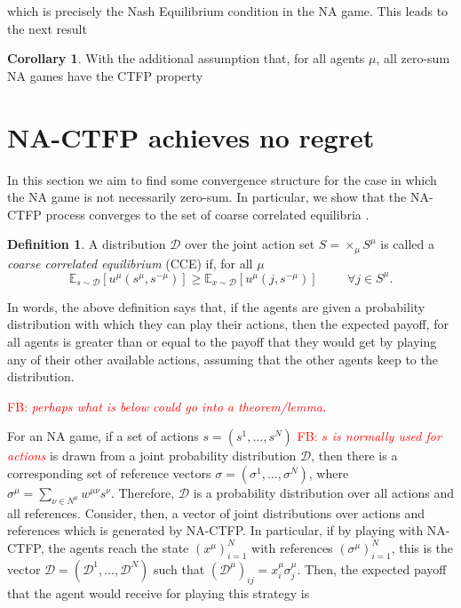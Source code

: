 \documentclass{article}
\theoremstyle{definition}
\newtheorem{definition}{Definition}
\newtheorem{corollary}{Corollary}
\newcommand{\fb}[1]{\textcolor{red}{FB: \textit{#1}}}
\newcommand{\wmunu}{w^{\mu \nu}}
\newcommand{\xmu}{x^{\mu}}
\newcommand{\refmu}{\sigma^{\mu}}
\begin{document}
  which is precisely the Nash Equilibrium condition in the NA game. This leads to the next result

  \begin{corollary}
    With the additional assumption that, for all agents $\mu$, all zero-sum NA games have the CTFP property
  \end{corollary}

\section{NA-CTFP achieves no regret}
  \label{sec::CCEConvergence}

  In this section we aim to find some convergence structure for the
  case in which the NA game is not necessarily zero-sum. In
  particular, we show that the NA-CTFP process converges to the set of
  coarse correlated equilibria \cite{}.
  \begin{definition}
    A distribution $\mathcal{D}$ over the joint action set $S =
    \times_\mu S^\mu$ is called a \emph{coarse correlated equilibrium}
    (CCE) if, for all $\mu$
    \begin{equation}
      \mathbb{E}_{s \sim \mathcal{D}}[u^\mu (s^\mu, s^{- \mu})] \geq
      \mathbb{E}_{x \sim \mathcal{D}}[u^\mu (j, s^{-
          \mu})] \hspace{1cm} \forall j \in S^\mu.
    \end{equation}
  \end{definition}

  In words, the above definition says that, if the agents are given a
  probability distribution with which they can play their actions, then
  the expected payoff, for all agents is greater than or equal to the
  payoff that they would get by playing any of their other available
  actions, assuming that the other agents keep to the distribution.

  \fb{perhaps what is below could go into a theorem/lemma.}
  
  For an NA game, if a set of actions $s = (s^1, \ldots, s^N)$ \fb{$s$ is normally used for actions} is
  drawn from a joint probability distribution $\mathcal{D}$, then
  there is a corresponding set of reference vectors $\sigma =
  (\sigma^1, \ldots, \sigma^N)$, where $\sigma^\mu = \sum_{\nu \in
    N^\mu} \wmunu s^\nu$.  Therefore, $\mathcal{D}$ is a probability
  distribution over all actions and all references.  Consider, then, a
  vector of joint distributions over actions and references which is
  generated by NA-CTFP. In particular, if by playing with NA-CTFP, the
  agents reach the state $(\xmu)_{i = 1}^N$ with references
  $(\refmu)_{i = 1}^N$, this is the vector $\mathcal{D} =
  (\mathcal{D}^1, ..., \mathcal{D}^N)$ such that
  $(\mathcal{D}^\mu)_{ij} = \xmu_i \refmu_j$. Then, the expected
  payoff that the agent would receive for playing this strategy is
\end{document}
